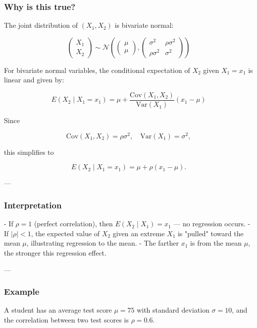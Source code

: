 \documentclass[twoside]{book}
\begin{document}
\subsubsection*{Why is this true?}

The joint distribution of \((X_1, X_2)\) is bivariate normal:

\[
\begin{pmatrix}
X_1 \\
X_2
\end{pmatrix}
\sim \mathcal{N}\left(
\begin{pmatrix}
\mu \\
\mu
\end{pmatrix},
\begin{pmatrix}
\sigma^2 & \rho \sigma^2 \\
\rho \sigma^2 & \sigma^2
\end{pmatrix}
\right)
\]

For bivariate normal variables, the conditional expectation of \(X_2\) given \(X_1 = x_1\) is linear and given by:

\[
E(X_2 \mid X_1 = x_1) = \mu + \frac{\mathrm{Cov}(X_1, X_2)}{\mathrm{Var}(X_1)} (x_1 - \mu)
\]

Since

\[
\mathrm{Cov}(X_1, X_2) = \rho \sigma^2, \quad \mathrm{Var}(X_1) = \sigma^2,
\]

this simplifies to

\[
E(X_2 \mid X_1 = x_1) = \mu + \rho (x_1 - \mu).
\]

---

\subsubsection*{Interpretation}

- If \(\rho = 1\) (perfect correlation), then \(E(X_2 \mid X_1) = x_1\) — no regression occurs.
- If \(|\rho| < 1\), the expected value of \(X_2\) given an extreme \(X_1\) is "pulled" toward the mean \(\mu\), illustrating regression to the mean.
- The farther \(x_1\) is from the mean \(\mu\), the stronger this regression effect.

---

\subsubsection*{Example}

A student has an average test score \(\mu = 75\) with standard deviation \(\sigma = 10\), and the correlation between two test scores is \(\rho = 0.6\).
\end{document}
